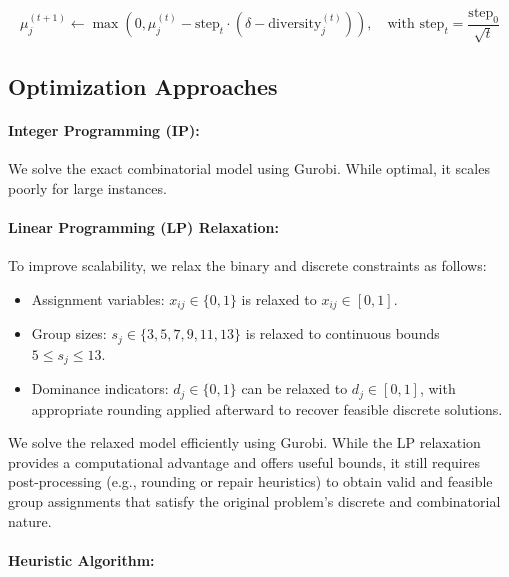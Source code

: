 \[
\mu_j^{(t+1)} \leftarrow \max(0, \mu_j^{(t)} - \text{step}_t \cdot (\delta - \text{diversity}_j^{(t)})), \quad \text{with } \text{step}_t = \frac{\text{step}_0}{\sqrt{t}}
\]

\subsection*{Optimization Approaches}

\paragraph{Integer Programming (IP):}
We solve the exact combinatorial model using Gurobi. While optimal, it scales poorly for large instances.

\paragraph{Linear Programming (LP) Relaxation:}
To improve scalability, we relax the binary and discrete constraints as follows:  
\begin{itemize}  
    \item Assignment variables: \( x_{ij} \in \{0, 1\} \) is relaxed to \( x_{ij} \in [0, 1] \).  
    \item Group sizes: \( s_j \in \{3, 5, 7, 9, 11, 13\} \) is relaxed to continuous bounds \( 5 \leq s_j \leq 13 \).  
    \item Dominance indicators: \( d_j \in \{0, 1\} \) can be relaxed to \( d_j \in [0, 1] \), with appropriate rounding applied afterward to recover feasible discrete solutions.  
\end{itemize}  
We solve the relaxed model efficiently using Gurobi.
While the LP relaxation provides a computational advantage and offers useful bounds,
it still requires post-processing (e.g., rounding or repair heuristics)
to obtain valid and feasible group assignments that satisfy the original problem's discrete and combinatorial nature.

\paragraph{Heuristic Algorithm:}

